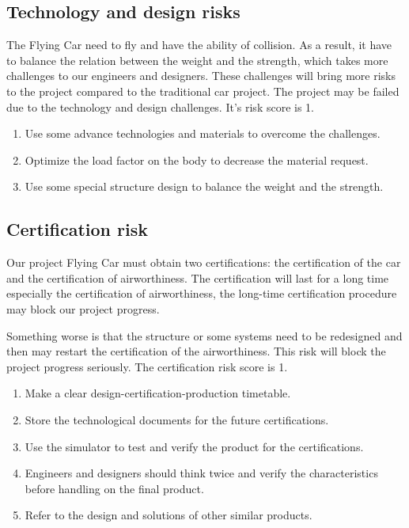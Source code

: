 \subsection{Technology and design risks}

The Flying Car need to fly and have the ability of collision. As a result, it have to balance the relation between the weight and the strength, which takes more challenges to our engineers and designers. These challenges will bring more risks to the project compared to the traditional car project. The project may be failed due to the technology and design challenges. It’s risk score is 1.
\begin{enumerate}
\item Use some advance technologies and materials to overcome the challenges.

\item Optimize the load factor on the body to decrease the material request. 

\item Use some special structure design to balance the weight and the strength.
\end{enumerate}

\subsection{Certification risk}

Our project Flying Car must obtain two certifications: the certification of the car and the certification of airworthiness. The certification will last for a long time especially the certification of airworthiness, the long-time certification procedure may block our project progress.

Something worse is that the structure or some systems need to be redesigned and then may restart the certification of the airworthiness. This risk will block the project progress seriously. The certification risk score is 1.

\begin{enumerate}
\item Make a clear design-certification-production timetable.

\item Store the technological documents for the future certifications.

\item Use the simulator to test and verify the product for the certifications.

\item Engineers and designers should think twice and verify the characteristics before handling on the final product.

\item Refer to the design and solutions of other similar products.
\end{enumerate}

